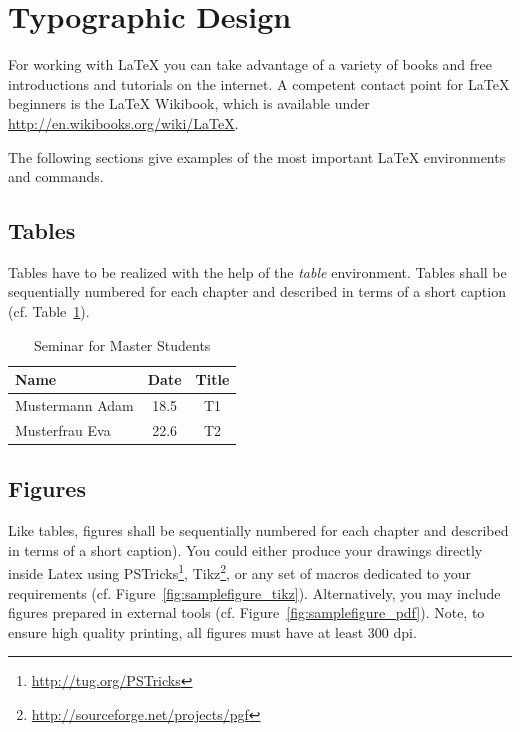 \documentclass{llncs}
\begin{document}
\section{Typographic Design}

For working with LaTeX you can take advantage of a variety of books and free introductions and tutorials on the internet. A competent contact point for LaTeX beginners is the LaTeX Wikibook, which is available under \url{http://en.wikibooks.org/wiki/LaTeX}. 

The following sections give examples of the most important LaTeX environments and commands.

\subsection{Tables}

Tables have to be realized with the help of the \textit{table} environment. Tables shall be sequentially numbered for each chapter and described in terms of a short caption (cf. Table~\ref{tab:diplomaseminar}).

\begin{table}[htb]
	\centering
	\begin{tabular}{|l|c|c|}
		\hline \textbf{Name} & \textbf{Date} & \textbf{Title} \\
		\hline
		\hline Mustermann Adam  & 18.5   & T1    \\
		\hline Musterfrau Eva  & 22.6   & T2    \\
		\hline
	\end{tabular}
	\caption{Seminar for Master Students}
	\label{tab:diplomaseminar}
\end{table}


\subsection{Figures}

Like tables, figures shall be sequentially numbered for each chapter and described in terms of a short caption). You could either produce your drawings directly inside Latex using PSTricks\footnote{\url{http://tug.org/PSTricks}}, Tikz\footnote{\url{http://sourceforge.net/projects/pgf}}, or any set of macros dedicated to your requirements (cf. Figure~\ref{fig:samplefigure_tikz}). Alternatively, you may include figures prepared in external tools (cf. Figure~\ref{fig:samplefigure_pdf}). Note, to ensure high quality printing, all figures must have at least 300 dpi.
\end{document}
